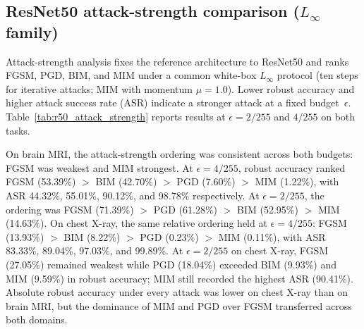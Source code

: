 \documentclass[12pt,a4paper,oneside]{report}
\begin{document}
\subsection{ResNet50 attack-strength comparison ($L_\infty$ family)}
\label{sec:results-r50-attack-strength}

Attack-strength analysis fixes the reference architecture to ResNet50 and ranks FGSM, PGD, BIM, and MIM under a common white-box $L_\infty$ protocol (ten steps for iterative attacks; MIM with momentum $\mu = 1.0$). Lower robust accuracy and higher attack success rate (ASR) indicate a stronger attack at a fixed budget~$\epsilon$. Table~\ref{tab:r50_attack_strength} reports results at $\epsilon = 2/255$ and $4/255$ on both tasks.

On brain MRI, the attack-strength ordering was consistent across both budgets: FGSM was weakest and MIM strongest. At $\epsilon = 4/255$, robust accuracy ranked FGSM (53.39\%) $>$ BIM (42.70\%) $>$ PGD (7.60\%) $>$ MIM (1.22\%), with ASR 44.32\%, 55.01\%, 90.12\%, and 98.78\% respectively. At $\epsilon = 2/255$, the ordering was FGSM (71.39\%) $>$ PGD (61.28\%) $>$ BIM (52.95\%) $>$ MIM (14.63\%). On chest X-ray, the same relative ordering held at $\epsilon = 4/255$: FGSM (13.93\%) $>$ BIM (8.22\%) $>$ PGD (0.23\%) $>$ MIM (0.11\%), with ASR 83.33\%, 89.04\%, 97.03\%, and 99.89\%. At $\epsilon = 2/255$ on chest X-ray, FGSM (27.05\%) remained weakest while PGD (18.04\%) exceeded BIM (9.93\%) and MIM (9.59\%) in robust accuracy; MIM still recorded the highest ASR (90.41\%). Absolute robust accuracy under every attack was lower on chest X-ray than on brain MRI, but the dominance of MIM and PGD over FGSM transferred across both domains.
\end{document}
